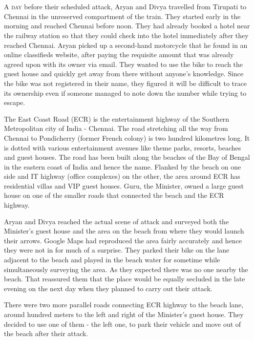 \chapter{}

\lettrine{A}{ day} before their scheduled attack, Aryan and Divya travelled from Tirupati to
Chennai in the unreserved compartment of the train. They started early in the
morning and reached Chennai before noon. They had already booked a hotel near
the railway station so that they could check into the hotel immediately after
they reached Chennai. Aryan picked up a second-hand motorcycle that he found in
an online classifieds website, after paying the requisite amount that was
already agreed upon with its owner via email. They wanted to use the bike to
reach the guest house and quickly get away from there without anyone's
knowledge. Since the bike was not registered in their name, they figured it will
be difficult to trace its ownership even if someone managed to note down the
number while trying to escape.

The East Coast Road (ECR) is the entertainment highway of the Southern
Metropolitan city of India - Chennai. The road stretching all the way from
Chennai to Pondicherry (former French colony) is two hundred kilometres long. It
is dotted with various entertainment avenues like theme parks, resorts, beaches
and guest houses. The road has been built along the beaches of the Bay of Bengal
in the eastern coast of India and hence the name. Flanked by the beach on one
side and IT highway (office complexes) on the other, the area around ECR has
residential villas and VIP guest houses. Guru, the Minister, owned a large guest
house on one of the smaller roads that connected the beach and the ECR highway.

Aryan and Divya reached the actual scene of attack and surveyed both the
Minister's guest house and the area on the beach from where they would launch
their arrows. Google Maps had reproduced the area fairly accurately and hence
they were not in for much of a surprise. They parked their bike on the lane
adjacent to the beach and played in the beach water for sometime while
simultaneously surveying the area. As they expected there was no one nearby the
beach. That reassured them that the place would be equally secluded in the late
evening on the next day when they planned to carry out their attack.

There were two more parallel roads connecting ECR highway to the beach lane,
around hundred meters to the left and right of the Minister's guest house. They
decided to use one of them - the left one, to park their vehicle and move out of
the beach after their attack.

